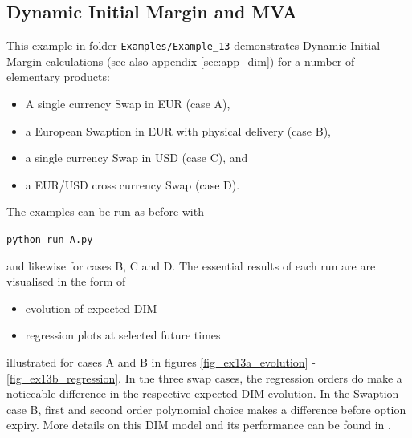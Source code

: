 \documentclass[12pt, a4paper]{article}
\begin{document}
\subsection{Dynamic Initial Margin and MVA}\label{sec:dim}

This example in folder {\tt Examples/Example\_13} demonstrates Dynamic Initial Margin calculations (see also appendix
\ref{sec:app_dim}) for a number of elementary products:
\begin{itemize}
\item A single currency Swap in EUR (case A), 
\item a European Swaption in EUR with physical delivery (case B), 
\item a single currency Swap in USD (case C), and 
\item a EUR/USD cross currency Swap (case D).
\end{itemize}

The examples can be run as before with 

\medskip
\centerline{\tt python run\_A.py} 

\medskip
and likewise for cases B, C and D. The essential results of each run are are visualised in the form of 
\begin{itemize}
\item evolution of expected DIM
\item regression plots at selected future times 
\end{itemize}
illustrated for cases A and B in figures \ref{fig_ex13a_evolution} - \ref{fig_ex13b_regression}. 
In the three swap cases, the regression orders do make a noticeable difference in the respective expected DIM evolution. In the Swaption case B, first and second order polynomial choice makes a difference before option expiry. More details on this DIM model and its performance can be found in \cite{Anfuso2016,LichtersEtAl}.
 
\end{document}
